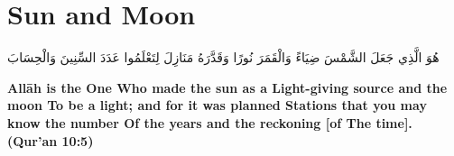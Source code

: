 \chapter{Sun and Moon}
\begin{center}
    {\Huge    
        \begin{Arabic}
            هُوَ الَّذِي جَعَلَ الشَّمْسَ ضِيَاءً وَالْقَمَرَ نُورًا وَقَدَّرَهُ مَنَازِلَ لِتَعْلَمُوا عَدَدَ السِّنِينَ وَالْحِسَابَ
        \end{Arabic}
    }    
\end{center}
\vspace*{\fill}
\vspace{3cm}
\begin{center}
    \large \textbf{Allāh is the One Who made the sun as a Light-giving source and the moon To be a light; and for it was planned Stations that you may know the number Of the years and the reckoning [of The time]. (Qur'an 10:5)}
\end{center}
